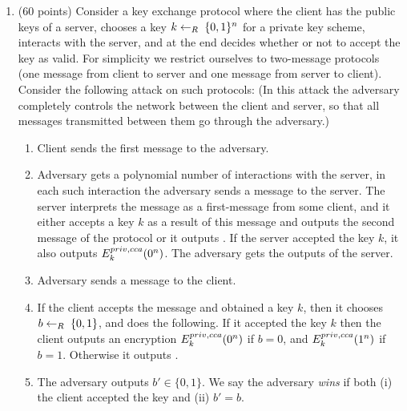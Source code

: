 \documentclass{article}
\begin{document}
\begin{enumerate}
\item{}
(60 points) Consider a key exchange protocol where the client has the public keys of a server, chooses a key $k \leftarrow_R\;\{0,1\}^n$ for
a private key scheme, interacts with the server, and at the end decides whether or not to accept the key as valid. For
simplicity we restrict ourselves to two-message protocols (one message from client to server and one message from
server to client). Consider the following attack on such protocols: (In this attack the adversary completely controls
the network between the client and server, so that all messages transmitted between them go through the adversary.)%

\begin{enumerate}%

\item{}
Client sends the first message to the adversary.%

\item{}
Adversary gets a polynomial number of interactions with the server, in each such interaction the adversary
sends a message to the server. The server interprets the message as a first-message from some client, and it
either accepts a key $k$ as a result of this message and outputs the second message of the protocol  or it
outputs  . If the server accepted the key $k$, it also outputs $E^{priv,cca}_k(0^n)$. The adversary gets
the outputs of the server.%

\item{}
Adversary sends a message to the client.%

\item{}
If the client accepts the message and obtained a key $k$, then it chooses $b \leftarrow_R\; \{0,1\}$, and does the
following. If it accepted the key $k$  then the client outputs an encryption $E^{priv,cca}_k(0^n)$ if $b=0$, and
$E^{priv,cca}_k(1^n)$ if $b=1$. Otherwise it outputs .%

\item{}
The adversary outputs $b' \in \{0,1\}$. We say the adversary \emph{wins} if both (i) the client
accepted the key and (ii) $b'=b$.%
\end{enumerate}%
\end{enumerate}%
\end{document}
